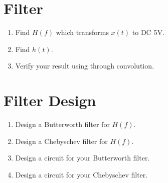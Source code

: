 \documentclass[journal,12pt,twocolumn]{IEEEtran}
\renewcommand\thesection{\arabic{section}}
\begin{document}
\section{Filter}
\begin{enumerate}[label=\thesection.\arabic*, ref=\thesection.\theenumi]


\item Find $H(f)$ which transforms $x(t)$ to DC 5V. \\
	\solution

\item Find $h(t)$.


\item Verify your result using  through convolution.


\end{enumerate}



\section{Filter Design}

\begin{enumerate}[label=\thesection.\arabic*, ref=\thesection.\theenumi]


\item Design a Butterworth filter for $H(f)$.


\item Design a Chebyschev filter for $H(f)$.


\item Design a circuit for your Butterworth filter.


\item Design a circuit for your Chebyschev filter.


\end{enumerate}
\end{document}
